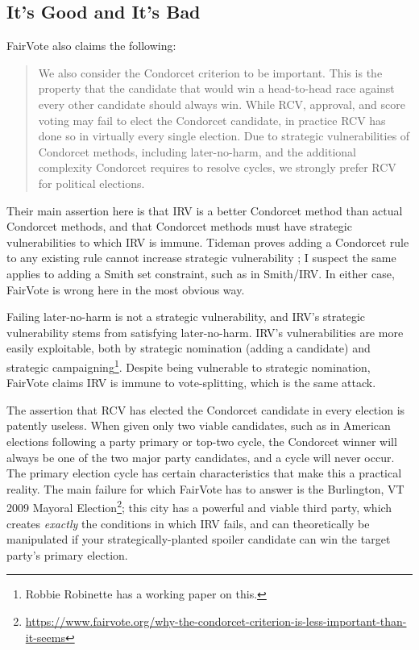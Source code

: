 \subsection{It's Good and It's Bad}

FairVote also claims the following:

\begin{quotation}
    We also consider the Condorcet criterion to be important. This is the property that the candidate that would win a head-to-head race against every other candidate should always win. While RCV, approval, and score voting may fail to elect the Condorcet candidate, in practice RCV has done so in virtually every single election. Due to strategic vulnerabilities of Condorcet methods, including later-no-harm, and the additional complexity Condorcet requires to resolve cycles, we strongly prefer RCV for political elections.
\end{quotation}

Their main assertion here is that IRV is a better Condorcet method than actual Condorcet methods, and that Condorcet methods must have strategic vulnerabilities to which IRV is immune.  Tideman proves adding a Condorcet rule to any existing rule cannot increase strategic vulnerability \autocite{Tideman2019}; I suspect the same applies to adding a Smith set constraint, such as in Smith/IRV.  In either case, FairVote is wrong here in the most obvious way.

Failing later-no-harm is not a strategic vulnerability, and IRV's strategic vulnerability stems from satisfying later-no-harm.  IRV's vulnerabilities are more easily exploitable, both by strategic nomination (adding a candidate) and strategic campaigning\footnote{Robbie Robinette has a working paper on this.}.  Despite being vulnerable to strategic nomination, FairVote claims IRV is immune to vote-splitting, which is the same attack.

The assertion that RCV has elected the Condorcet candidate in every election is patently useless.  When given only two viable candidates, such as in American elections following a party primary or top-two cycle, the Condorcet winner will always be one of the two major party candidates, and a cycle will never occur.  The primary election cycle has certain characteristics that make this a practical reality.  The main failure for which FairVote has to answer is the Burlington, VT 2009 Mayoral Election\footnote{\url{https://www.fairvote.org/why-the-condorcet-criterion-is-less-important-than-it-seems}}; this city has a powerful and viable third party, which creates \textit{exactly} the conditions in which IRV fails, and can theoretically be manipulated if your strategically-planted spoiler candidate can win the target party's primary election.

